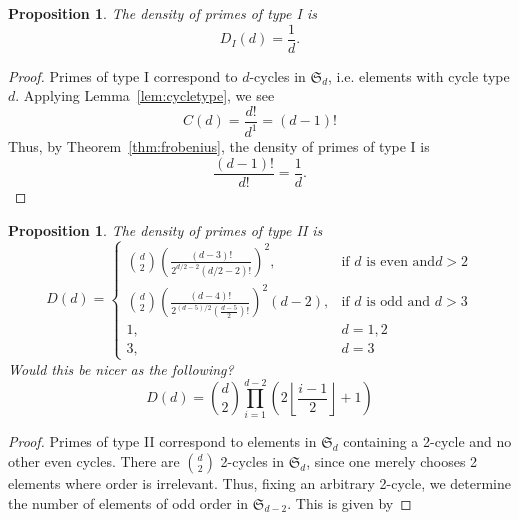 \documentclass[11pt]{article}
\theoremstyle{plain}
\newtheorem{proposition}[theorem]{Proposition}
\theoremstyle{definition}
\theoremstyle{remark}
\numberwithin{equation}{section}
\numberwithin{table}{section}
\renewcommand{\SS}{\mathfrak{S}}
\begin{document}
\begin{proposition}
  The density of primes of type I is 
  \begin{equation*}
    D_I(d)=\frac{1}{d}.
  \end{equation*}
\end{proposition}
\begin{proof}
  Primes of type I correspond to $d$-cycles in $\SS_d$, i.e. elements with 
  cycle type $d$. Applying Lemma~\ref{lem:cycletype}, we see
  \begin{equation*}
    C(d)=\frac{d!}{d^1}=(d-1)!
  \end{equation*}
  Thus, by Theorem~\ref{thm:frobenius}, the density of primes of type I is
  \begin{equation*}
    \frac{(d-1)!}{d!}=\frac{1}{d}.
  \end{equation*}
\end{proof}

\begin{proposition}
  The density of primes of type II is 
  \begin{equation*}
    D(d)=\left\{ 
      \begin{array}{rl}
        \binom{d}{2}\left(\frac{(d-3)!}{2^{d/2-2}(d/2-2)!}\right)^2,&\text{if }d\text{ is even and}d>2\\
        \binom{d}{2}\left(\frac{(d-4)!}{2^{(d-5)/2}(\frac{d-5}{2})!}\right)^2(d-2),&\text{if }d\text{ is odd and }d>3\\
        1,&d=1,2\\
        3,&d=3
      \end{array}
    \right.
  \end{equation*}
  Would this be nicer as the following?
  \begin{equation*}
    D(d)=\binom{d}{2}\prod_{i=1}^{d-2}\left(2\left\lfloor\frac{i-1}{2}\right\rfloor+1\right)
  \end{equation*}
\end{proposition}
\begin{proof}
  Primes of type II correspond to elements in $\SS_d$ containing a 2-cycle and no other
  even cycles. There are $\binom{d}{2}$ 2-cycles in $\SS_d$, since one merely chooses
  2 elements where order is irrelevant. Thus, fixing an arbitrary 2-cycle, we determine
  the number of elements of odd order in $\SS_{d-2}$. This is given by
\end{proof}
\end{document}
